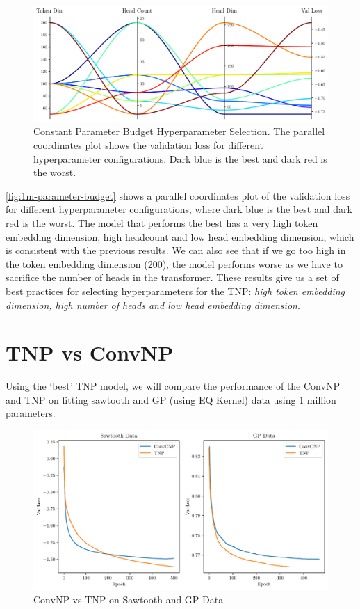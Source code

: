 \documentclass[../../main.tex]{subfiles}
\begin{document}

\FloatBarrier
\begin{figure}[ht!]
	\centering
	\includegraphics[width=0.9\linewidth]{./model-comparsion-1d.pdf}
	\caption{Constant Parameter Budget Hyperparameter Selection. The parallel coordinates plot shows the validation loss for different hyperparameter configurations. Dark blue is the best and dark red is the worst.}
	\label{fig:1m-parameter-budget}
\end{figure}
\FloatBarrier

\autoref{fig:1m-parameter-budget} shows a parallel coordinates plot of the validation loss for different hyperparameter configurations, where dark blue is the best and dark red is the worst. The model that performs the best has a very high token embedding dimension, high headcount and low head embedding dimension, which is consistent with the previous results. We can also see that if we go too high in the token embedding dimension (200), the model performs worse as we have to sacrifice the number of heads in the transformer. These results give us a set of best practices for selecting hyperparameters for the TNP: \emph{high token embedding dimension, high number of heads and low head embedding dimension}.





\section{TNP vs ConvNP}


Using the `best' TNP model, we will compare the performance of the ConvNP and TNP on fitting sawtooth and GP (using EQ Kernel) data using 1 million parameters. 


\begin{figure}[H]
	\centering
	\includegraphics[width=0.5\linewidth]{./convcnp-vs-tetnp-saw-gp.pdf}
	\caption{ConvNP vs TNP on Sawtooth and GP Data}
	\label{fig:conv-tnp-1d-result}
\end{figure}
\end{document}
